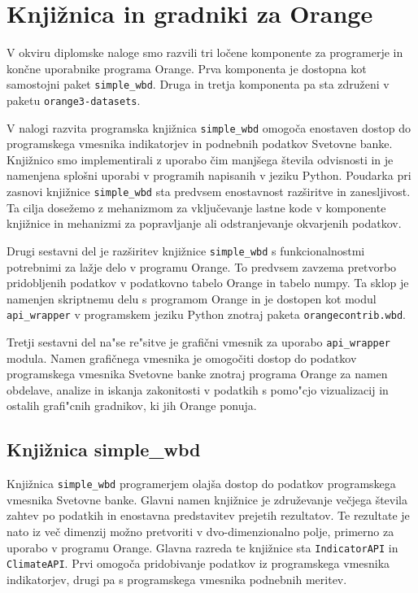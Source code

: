 
\chapter{Knjižnica in gradniki za Orange}

V okviru diplomske naloge smo razvili tri ločene komponente za programerje in
končne uporabnike programa Orange. Prva komponenta je
dostopna kot samostojni paket 
\verb|simple_wbd|. 
Druga in tretja komponenta pa sta združeni v paketu
\verb|orange3-datasets|.


V nalogi razvita programska knjižnica \verb|simple_wbd|
omogoča enostaven dostop do programskega vmesnika indikatorjev in podnebnih
podatkov Svetovne banke. Knjižnico smo implementirali z uporabo čim manjšega
števila odvisnosti in je 
namenjena splošni uporabi v programih napisanih v jeziku Python. Poudarka pri zasnovi knjižnice 
\verb|simple_wbd| sta predvsem enostavnost razširitve in zanesljivost. Ta cilja
dosežemo z mehanizmom za vključevanje lastne kode v komponente knjižnice
in mehanizmi za popravljanje ali odstranjevanje okvarjenih podatkov.


Drugi sestavni del je razširitev knjižnice \verb|simple_wbd| s 
funkcionalnostmi potrebnimi za lažje delo v programu Orange. To predvsem 
zavzema pretvorbo pridobljenih podatkov v podatkovno tabelo Orange in tabelo 
numpy. Ta sklop je namenjen skriptnemu delu s programom Orange 
\cite{orange_scripting} in je dostopen
kot modul \verb|api_wrapper| v programskem jeziku Python znotraj paketa \verb|orangecontrib.wbd|.


Tretji sestavni del na"se re"sitve je grafični vmesnik za uporabo \verb|api_wrapper| modula.
Namen grafičnega vmesnika je omogočiti dostop do podatkov 
programskega vmesnika Svetovne banke znotraj programa Orange za namen obdelave,
analize in iskanja zakonitosti v podatkih s pomo"cjo vizualizacij in ostalih grafi"cnih gradnikov,
ki jih Orange ponuja.

\section{Knjižnica simple\_wbd}

Knjižnica \verb|simple_wbd| programerjem olajša dostop do podatkov 
programskega vmesnika Svetovne banke. Glavni namen knjižnice je 
združevanje večjega števila zahtev po podatkih in enostavna predstavitev 
prejetih rezultatov. Te rezultate je nato iz več dimenzij možno pretvoriti v 
dvo-dimenzionalno polje, primerno za uporabo v programu Orange. Glavna 
razreda te knjižnice sta \verb|IndicatorAPI| in \verb|ClimateAPI|. Prvi 
omogoča pridobivanje podatkov iz programskega vmesnika indikatorjev, drugi pa 
s programskega vmesnika podnebnih meritev.


